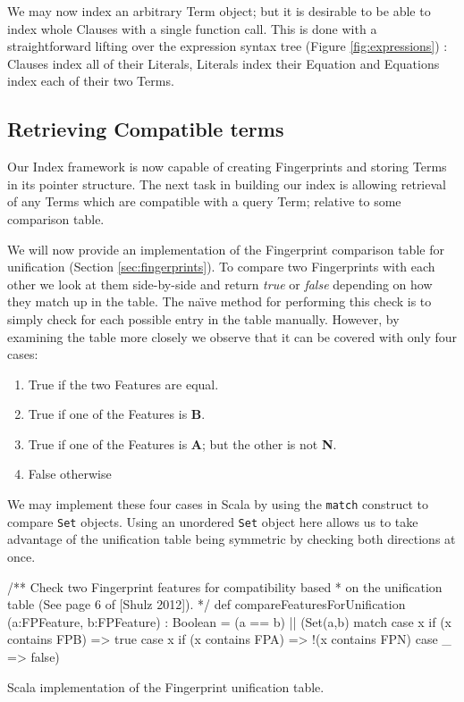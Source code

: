 We may now index an arbitrary Term object; but it is desirable to be able to index
whole Clauses with a single function call. This is done with a straightforward lifting
over the expression syntax tree (Figure \ref{fig:expressions}) : Clauses index all of their Literals, Literals index
their Equation and Equations index each of their two Terms.

\subsection{Retrieving Compatible terms}
\label{sec:retrieve}

Our Index framework is now capable of creating Fingerprints and storing Terms in
its pointer structure. The next task in building our index is allowing retrieval
of any Terms which are compatible with a query Term; relative to some comparison
table.

We will now provide an implementation of the Fingerprint comparison table for unification (Section \ref{sec:fingerprints}).
To compare two Fingerprints with each other we look at them side-by-side and return
\emph{true} or \emph{false} depending on how they match up in the table.
The na\"{\i}ve method for performing this check is to simply check for each possible
entry in the table manually. However, by examining the table more closely we observe
that it can be covered with only four cases:
\begin{enumerate}
\item True if the two Features are equal.
\item True if one of the Features is \textbf{B}.
\item True if one of the Features is \textbf{A}; but the other is not \textbf{N}.
\item False otherwise 
\end{enumerate}
We may implement these four cases in Scala by using the \verb!match! construct
to compare \verb!Set! objects. Using an unordered \verb!Set! object here allows
us to take advantage of the unification table being symmetric by checking both
directions at once. 
\begin{listing}[H]
\begin{scalacode}
 /** Check two Fingerprint features for compatibility based
   * on the unification table (See page 6 of [Shulz 2012]). */
  def compareFeaturesForUnification
         (a:FPFeature, b:FPFeature) : Boolean =
  (a == b) || 
  (Set(a,b) match {
    case x if (x contains FPB) => true
    case x if (x contains FPA) => !(x contains FPN)
    case _ => false})
\end{scalacode}
\caption{Scala implementation of the Fingerprint unification table. \protect\cite[p6]{shulz12}}
\label{lst:unitable}
\end{listing}


